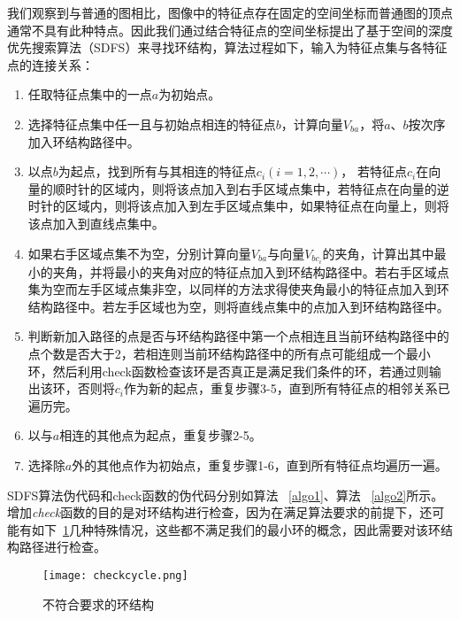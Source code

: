 我们观察到与普通的图相比，图像中的特征点存在固定的空间坐标而普通图的顶点通常不具有此种特点。因此我们通过结合特征点的空间坐标提出了基于空间的深度优先搜索算法（SDFS）来寻找环结构，算法过程如下，输入为特征点集与各特征点的连接关系：
\begin{enumerate}
\item 任取特征点集中的一点$a$为初始点。
\item 选择特征点集中任一且与初始点相连的特征点$b$，计算向量$V_{ba}$，将$a$、$b$按次序加入环结构路径中。 
\item 以点$b$为起点，找到所有与其相连的特征点$c_{i}(i=1,2,\cdots)$， 若特征点$c_i$在向量的顺时针的区域内，则将该点加入到右手区域点集中，若特征点在向量的逆时针的区域内，则将该点加入到左手区域点集中，如果特征点在向量上，则将该点加入到直线点集中。
\item 如果右手区域点集不为空，分别计算向量$V_{ba}$与向量$V_{bc_i}$的夹角，计算出其中最小的夹角，并将最小的夹角对应的特征点加入到环结构路径中。若右手区域点集为空而左手区域点集非空，以同样的方法求得使夹角最小的特征点加入到环结构路径中。若左手区域也为空，则将直线点集中的点加入到环结构路径中。
\item 判断新加入路径的点是否与环结构路径中第一个点相连且当前环结构路径中的点个数是否大于2，若相连则当前环结构路径中的所有点可能组成一个最小环，然后利用check函数检查该环是否真正是满足我们条件的环，若通过则输出该环，否则将$c_i$作为新的起点，重复步骤3-5，直到所有特征点的相邻关系已遍历完。
\item 以与$a$相连的其他点为起点，重复步骤2-5。
\item 选择除$a$外的其他点作为初始点，重复步骤1-6，直到所有特征点均遍历一遍。
\end{enumerate}

SDFS算法伪代码和check函数的伪代码分别如算法 ~\ref{algo1}、算法 ~\ref{algo2}所示。增加\emph{check}函数的目的是对环结构进行检查，因为在满足算法要求的前提下，还可能有如下~\ref{false_cycle}几种特殊情况，这些都不满足我们的最小环的概念，因此需要对该环结构路径进行检查。
   \begin{figure}[ht!]
   \centering
  \texttt{[image: checkcycle.png]}
  \caption{不符合要求的环结构}
\label{false_cycle}
 \end{figure}


